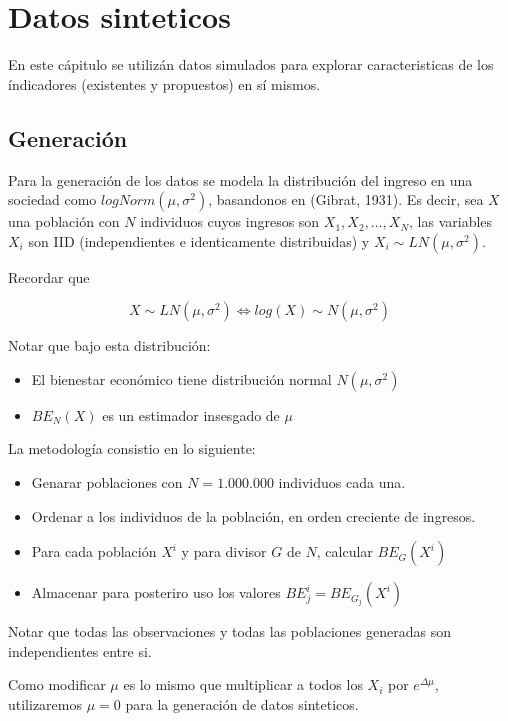 \chapter{Datos sinteticos} \label{chapter:datos_sinteticos}

En este cápitulo se utilizán datos simulados para explorar caracteristicas de los índicadores (existentes y propuestos) en sí mismos.

\section{Generación}

Para la generación de los datos se modela la distribución del ingreso en una sociedad como $logNorm(\mu,\sigma^2)$, basandonos en (Gibrat, 1931)\cite{gibrat1931inégalités}. Es decir, sea $X$ una población con $N$ individuos cuyos ingresos son $X_1, X_2, \dots, X_N$, las variables $X_i$ son IID (independientes e identicamente distribuidas) y $X_i \sim LN(\mu, \sigma^2)$.

Recordar que 

$$
    X \sim LN(\mu, \sigma^2) \iff log(X) \sim N(\mu,\sigma^2)
$$

Notar que bajo esta distribución:

\begin{itemize}
    \item El bienestar económico tiene distribución normal $N(\mu,\sigma^2)$
    \item $BE_N(X)$ es un estimador insesgado de $\mu$
\end{itemize}

La metodología consistio en lo siguiente:

\begin{itemize}
    \item Genarar poblaciones con $N = 1.000.000$ individuos cada una.
    \item Ordenar a los individuos de la población, en orden creciente de ingresos.
    \item Para cada población $X^i$ y para divisor $G$ de $N$, calcular $BE_G(X^i)$
    \item Almacenar para posteriro uso los valores $BE_j^i = BE_{G_j}(X^i)$
\end{itemize}

Notar que todas las observaciones y todas las poblaciones generadas son independientes entre si.

Como modificar $\mu$ es lo mismo que multiplicar a todos los $X_i$ por $e^{\Delta \mu}$, utilizaremos $\mu = 0$ para la generación de datos sinteticos.

